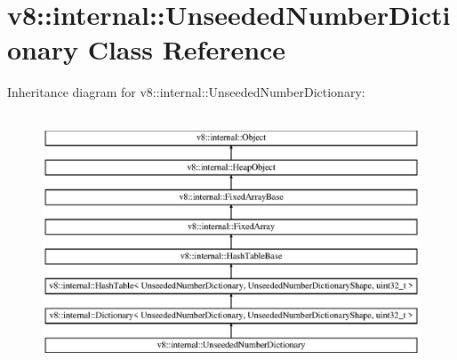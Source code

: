 \hypertarget{classv8_1_1internal_1_1_unseeded_number_dictionary}{}\section{v8\+:\+:internal\+:\+:Unseeded\+Number\+Dictionary Class Reference}
\label{classv8_1_1internal_1_1_unseeded_number_dictionary}
Inheritance diagram for v8\+:\+:internal\+:\+:Unseeded\+Number\+Dictionary\+:\begin{figure}[H]
\begin{center}
\leavevmode
\includegraphics[height=7.645051cm]{classv8_1_1internal_1_1_unseeded_number_dictionary}
\end{center}
\end{figure}
